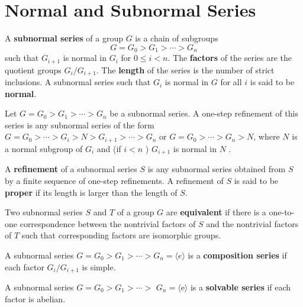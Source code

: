 \section{Normal and Subnormal Series} %
\begin{definition}
    A \textbf{subnormal series} of a group $G$ is a chain of subgroups
    \begin{equation*}
        G=G_0>G_1>\cdots>G_n
    \end{equation*}
    such that $G_{i+1}$ is normal in $G_i$ for $0 \leq i<n$.
    The \textbf{factors} of the series are the quotient groups $G_i /G_{i+1}$.
    The \textbf{length} of the series is the number of strict inclusions.
    A subnormal series such that $G_i$ is normal in $G$ for all $i$ is said to be \textbf{normal}.
\end{definition}
\begin{definition}
    Let $G=G_0>G_1>\cdots>G_{n}$ be a subnormal series.
    A one-step refinement of this series is any subnormal series of the form $G=G_0>\cdots>G_{i}>N>G_{i+1}>\cdots >G_{n}$ or $G=G_0>\cdots>G_{n}>N$, where $N$ is a normal subgroup of $G_{i}$ and (if $i<n$ ) $G_{i+1}$ is normal in $N$ .

    A \textbf{refinement} of a subnormal series $S$ is any subnormal series obtained from $S$ by a finite sequence of one-step refinements.
    A refinement of $S$ is said to be \textbf{proper} if its length is larger than the length of $S$.

    Two subnormal series $S$ and $T$ of a group $G$ are \textbf{equivalent} if there is a one-to-one correspondence between the nontrivial factors of $S$ and the nontrivial factors of $T$ such that corresponding factors are isomorphic groups.
\end{definition}
\begin{definition}
    A subnormal series $G=G_0>G_1>\cdots>G_{n}=\langle e\rangle$ is a \textbf{composition series} if each factor $G_i / G_{i+1}$ is simple.

    A subnormal series $G=G_0>G_1>\cdots>$ $G_{n}=\langle\mathrm{e}\rangle$ is a \textbf{solvable series} if each factor is abelian.
\end{definition}



